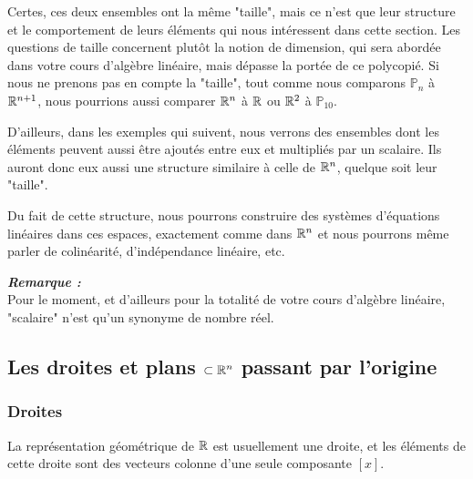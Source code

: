 Certes, ces deux ensembles ont la même "taille", mais ce n'est que leur structure et le comportement de leurs éléments qui nous intéressent dans cette section. Les questions de taille concernent plutôt la notion de dimension, qui sera abordée dans votre cours d'algèbre linéaire, mais dépasse la portée de ce polycopié. Si nous ne prenons pas en compte la "taille", tout comme nous comparons $\mathbb{P}_n$ à $\mathbb{R}^{n+1}$, nous pourrions aussi comparer $\mathbb{R}^n$ à $\mathbb{R}$ ou $\mathbb{R}^2$ à $\mathbb{P}_{10}$.

D'ailleurs, dans les exemples qui suivent, nous verrons des ensembles dont les éléments peuvent aussi être ajoutés entre eux et multipliés par un scalaire. Ils auront donc eux aussi une structure similaire à celle de $\mathbb{R}^n$, quelque soit leur "taille".

Du fait de cette structure, nous pourrons construire des systèmes d'équations linéaires dans ces espaces, exactement comme dans $\mathbb{R}^n$ et nous pourrons même parler de colinéarité, d'indépendance linéaire, etc.

\textbf{\textit{Remarque :}}\\
Pour le moment, et d'ailleurs pour la totalité de votre cours d'algèbre linéaire, "scalaire" n'est qu'un synonyme de nombre réel.

\subsection{Les droites et plans $\subset \mathbb{R}^n$ passant par l’origine}

\subsubsection{Droites}

La représentation géométrique de $\mathbb{R}$ est usuellement une droite, et les éléments de cette droite sont des vecteurs colonne d'une seule composante $[x]$.

\begin{center}
\end{center}

